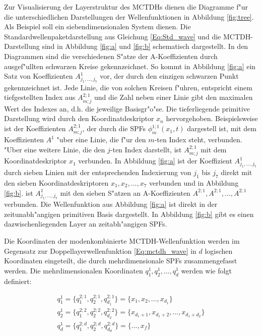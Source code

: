 Zur Visualisierung der Layerstruktur des MCTDHs dienen die Diagramme f"ur die unterschiedlichen Darstellungen der Wellenfunktionen in Abbildung \ref{fig:tree}.
Als Beispiel soll ein siebendimensionalen System dienen.
Die Standardwellenpaketdarstellung aus Gleichung \ref{Eq:Std_wave} und die MCTDH-Darstellung sind in Abbildung \ref{fig:a} und \ref{fig:b} schematisch dargestellt.
In den Diagrammen sind die verschiedenen S"atze der A-Koeffizienten durch ausgef"ullten schwarzen Kreise gekennzei\-chnet.
So kommt in Abbildung \ref{fig:a} ein Satz von Koeffizienten $A^{1}_{j_{1}, ..., j_{7}}$ vor, der durch den
einzigen schwarzen Punkt gekennzei\-chnet ist. 
Jede Linie, die von solchen Kreisen f"uhren, entspricht einem tiefgestellten Index aus $ A^{2;1}_{m;j} $ und die Zahl neben einer Linie gibt den maximalen
Wert des Indexes an, d.h. die jeweilige Basisgr"o"se. Die tieferliegende primitive Darstellung wird durch den Koordinatdeskriptor $x_n$ hervorgehoben.
Beispielsweise ist der Koeffizienten $A^{2;1}_{m;j}$, der durch die SPFs $ \phi^{1;1}_{m} (x_{1}, t) $ dargestell ist, mit dem 
Koeffizienten $A^1$ "uber eine Linie, die f"ur den $m$-ten Index steht, verbunden. "Uber eine weitere Linie, die den $j$-ten Index darstellt,
ist  $A^{2;1}_{m;j}$ mit dem Koordinatdeskriptor $x_1$ verbunden.
In Abbildung \ref{fig:a} ist der Koeffizient $A^{1}_{j_{1}, ..., j_{7}}$  durch sieben Linien mit der entsprechenden Indexierung von 
$j_1$ bis $j_7$ direkt mit den sieben Koordinatdeskriptoren $x_1,x_2,...,x_7$ verbunden und in Abbildung \ref{fig:b}. ist $A^{1}_{j_{1}, ..., j_{7}}$
mit den sieben S"atzen an A-Koeffizienten $A^{2;1},A^{2;1},...,A^{2;1}$ verbunden.
Die Wellenfunktion aus Abbildung \ref{fig:a} ist direkt 
in der zeitunabh"angigen primitiven Basis dargestellt. In Abbildung \ref{fig:b} gibt es einen dazwischenliegenden Layer an zeitabh"angigen SPFs. 

Die Koordinaten der modenkombinierte MCTDH-Wellenfunktion werden im Gegensatz zur Doppellayerwellenfunktion \ref{Eq:mctdh_wave}  in $d$ logischen Koordinaten
  eingeteilt, die durch mehrdimensionale SPFs zusammengefasst werden. Die mehrdimensionalen Koordinaten $q^{1}_{1}, q^{1}_{2}, ..., q^{1}_{d}$
  werden wie folgt definiert:


\begin{equation}
\begin{gathered}
   q^{1}_{1} = \{q^{2;1}_{1},q^{2;1}_{2},q^{2;1}_{d_{1}}\} = \{x_{1}, x_{2}, ..., x_{d_1}\} \\
  q^{1}_{2} = \{q^{2;2}_{1},q^{2;2}_{2},q^{2;2}_{d_{2}}\} = \{x_{d_{1}+1}, x_{d_{1}+2}, ..., x_{d_{1}+d_{2}}\} \\
  q^{1}_{d} = \{q^{2;d}_{1},q^{2;d}_{2},q^{2;d}_{d_{d}}\} = \{..., x_{f}\}
\end{gathered}
\end{equation}

